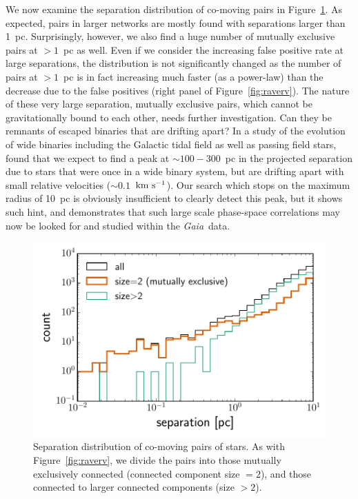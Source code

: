 \documentclass[manuscript, letterpaper]{aastex6}
\newcommand{\project}[1]{\textsl{#1}}
\newcommand{\gaia}{\project{Gaia}}
\newcommand{\kms}{\ensuremath{\rm km~s^{-1}}}
\begin{document}
We now examine the separation distribution of co-moving pairs in
Figure~\ref{fig:hist_separation}.
As expected, pairs in larger networks are mostly found with separations
larger than 1~pc.
Surprisingly, however, we also find a huge number of mutually exclusive pairs
at $>1$~pc as well. Even if we consider the increasing false positive rate at large
separations, the distribution is not significantly changed as the number of pairs
at $>1$~pc is in fact increasing much faster (as a power-law)
than the decrease due to the false positives (right panel of Figure~\ref{fig:raverv}).
The nature of these very large separation, mutually exclusive pairs,
which cannot be gravitationally bound to each other, needs further investigation.
Can they be remnants of escaped binaries that are drifting apart?
In a study of the evolution of wide binaries including the Galactic tidal field
as well as passing field stars, \citet{Jiang:2010aa} found that we expect
to find a peak at $\sim 100-300$~pc in the projected separation due to
stars that were once in a wide binary system, but are drifting apart with small
relative velocities ($\sim 0.1$~\kms).
Our search which stops on the maximum radius of 10~pc is obviously insufficient
to clearly detect this peak, but it shows such hint, and demonstrates
that such large scale phase-space correlations may now be looked for and studied within the \gaia\ data.

\begin{figure}[htbp]
  \begin{center}
    \includegraphics[width=\textwidth]{figures/hist_sep.pdf}
  \end{center}
  \caption{%
    Separation distribution of co-moving pairs of stars.
    As with Figure~\ref{fig:raverv},
    we divide the pairs into those mutually exclusively connected
    (connected component size $=2$), and those connected to larger connected components (size $>2$).
    \label{fig:hist_separation}
    }
\end{figure}
\end{document}
